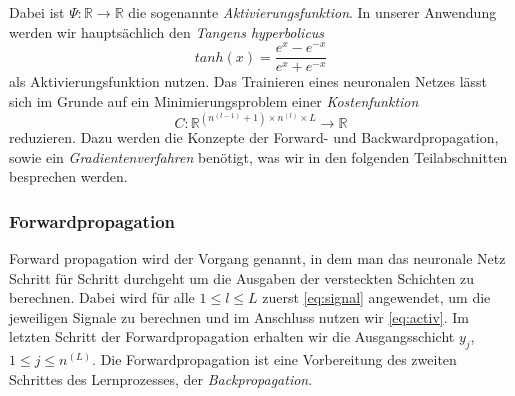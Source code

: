 Dabei ist $\Psi: \mathbb{R} \rightarrow \mathbb{R}$ die sogenannte \textit{Aktivierungsfunktion}. In unserer Anwendung werden wir
hauptsächlich den \textit{Tangens hyperbolicus}
\[
    tanh(x)=\frac{e^x - e^{-x}}{e^x + e^{-x}}
\]
als Aktivierungsfunktion nutzen. Das Trainieren eines neuronalen Netzes lässt sich im Grunde auf ein Minimierungsproblem
einer \textit{Kostenfunktion}
\[
    C: \mathbb{R}^{\left(n^{(l-1)} + 1\right) \times n^{(l)} \times L} \rightarrow \mathbb{R}
\]
reduzieren. Dazu werden die Konzepte der Forward- und Backwardpropagation, sowie ein \textit{Gradientenverfahren}
benötigt, was wir in den folgenden Teilabschnitten besprechen werden.

\subsubsection{Forwardpropagation}
Forward propagation wird der Vorgang genannt, in dem man das neuronale Netz Schritt für Schritt durchgeht um die
Ausgaben der versteckten Schichten zu berechnen. Dabei wird für alle $1 \leq l \leq L$ zuerst \eqref{eq:signal}
angewendet, um die jeweiligen Signale zu berechnen und im Anschluss nutzen wir \eqref{eq:activ}. Im letzten
Schritt der Forwardpropagation erhalten wir die Ausgangsschicht $y_{j}$, $1\leq j \leq n^{(L)}$. Die Forwardpropagation ist
eine Vorbereitung des zweiten Schrittes des Lernprozesses, der \textit{Backpropagation}.

